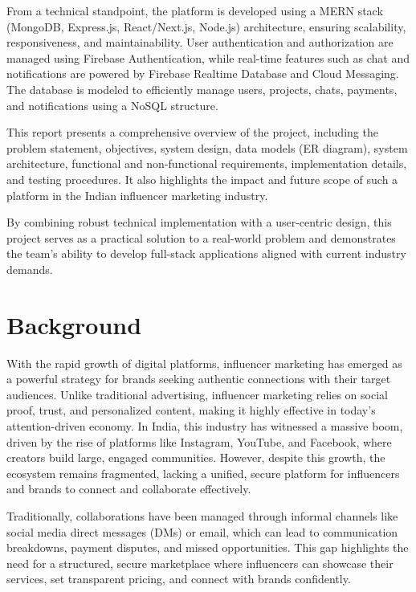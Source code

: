 \begin{justify}
From a technical standpoint, the platform is developed using a MERN stack (MongoDB, Express.js, React/Next.js, Node.js) architecture, ensuring scalability, responsiveness, and maintainability. User authentication and authorization are managed using Firebase Authentication, while real-time features such as chat and notifications are powered by Firebase Realtime Database and Cloud Messaging. The database is modeled to efficiently manage users, projects, chats, payments, and notifications using a NoSQL structure.
\par
This report presents a comprehensive overview of the project, including the problem statement, objectives, system design, data models (ER diagram), system architecture, functional and non-functional requirements, implementation details, and testing procedures. It also highlights the impact and future scope of such a platform in the Indian influencer marketing industry.
\par
By combining robust technical implementation with a user-centric design, this project serves as a practical solution to a real-world problem and demonstrates the team’s ability to develop full-stack applications aligned with current industry demands.

\section{Background}

With the rapid growth of digital platforms, influencer marketing has emerged as a powerful strategy for brands seeking authentic connections with their target audiences. Unlike traditional advertising, influencer marketing relies on social proof, trust, and personalized content, making it highly effective in today’s attention-driven economy. In India, this industry has witnessed a massive boom, driven by the rise of platforms like Instagram, YouTube, and Facebook, where creators build large, engaged communities. However, despite this growth, the ecosystem remains fragmented, lacking a unified, secure platform for influencers and brands to connect and collaborate effectively.

Traditionally, collaborations have been managed through informal channels like social media direct messages (DMs) or email, which can lead to communication breakdowns, payment disputes, and missed opportunities. This gap highlights the need for a structured, secure marketplace where influencers can showcase their services, set transparent pricing, and connect with brands confidently.


\end{justify}
